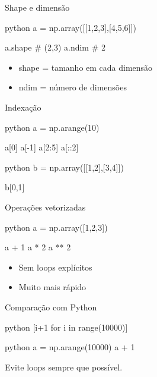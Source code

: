 \documentclass[xcolor=dvipsnames,t,aspectratio=169]{beamer}
\newcommand{\highlight}[1]{{\color{nes_dark_orange} #1}}
\begin{document}
\begin{frame}[c, fragile]{Shape e dimensão}

\begin{code}[Exemplo]{python}
a = np.array([[1,2,3],[4,5,6]])

a.shape   # (2,3)
a.ndim    # 2
\end{code}

\begin{itemize}
\item shape = tamanho em cada dimensão
\item ndim = número de dimensões
\end{itemize}

\end{frame}

\begin{frame}[c, fragile]{Indexação}

\begin{code}[Indexação]{python}
a = np.arange(10)

a[0]
a[-1]
a[2:5]
a[::2]
\end{code}

\begin{code}[2D]{python}
b = np.array([[1,2],[3,4]])

b[0,1]
\end{code}

\end{frame}

\begin{frame}[c, fragile]{Operações vetorizadas}

\begin{code}[Elementwise]{python}
a = np.array([1,2,3])

a + 1
a * 2
a ** 2
\end{code}

\begin{itemize}
\item Sem loops explícitos
\item Muito mais rápido
\end{itemize}

\end{frame}

\begin{frame}[c, fragile]{Comparação com Python}

\begin{code}[Python]{python}
[i+1 for i in range(10000)]
\end{code}

\begin{code}[NumPy]{python}
a = np.arange(10000)
a + 1
\end{code}


\highlight{Evite} loops sempre que possível.


\end{frame}
\end{document}
